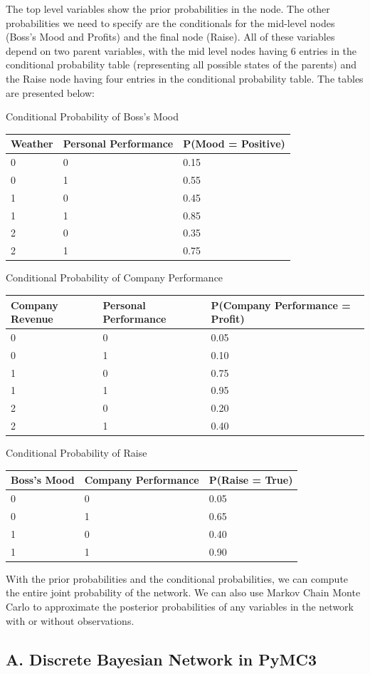 \documentclass[11pt]{article}
\begin{document}
The top level variables show the prior probabilities in the node. The
other probabilities we need to specify are the conditionals for the
mid-level nodes (Boss's Mood and Profits) and the final node (Raise).
All of these variables depend on two parent variables, with the mid
level nodes having 6 entries in the conditional probability table
(representing all possible states of the parents) and the Raise node
having four entries in the conditional probability table. The tables are
presented below:

Conditional Probability of Boss's Mood

\begin{longtable}[]{@{}lll@{}}
\toprule
Weather & Personal Performance & P(Mood = Positive)\tabularnewline
\midrule
\endhead
0 & 0 & 0.15\tabularnewline
0 & 1 & 0.55\tabularnewline
1 & 0 & 0.45\tabularnewline
1 & 1 & 0.85\tabularnewline
2 & 0 & 0.35\tabularnewline
2 & 1 & 0.75\tabularnewline
\bottomrule
\end{longtable}

Conditional Probability of Company Performance

\begin{longtable}[]{@{}lll@{}}
\toprule
Company Revenue & Personal Performance & P(Company Performance =
Profit)\tabularnewline
\midrule
\endhead
0 & 0 & 0.05\tabularnewline
0 & 1 & 0.10\tabularnewline
1 & 0 & 0.75\tabularnewline
1 & 1 & 0.95\tabularnewline
2 & 0 & 0.20\tabularnewline
2 & 1 & 0.40\tabularnewline
\bottomrule
\end{longtable}

Conditional Probability of Raise

\begin{longtable}[]{@{}lll@{}}
\toprule
Boss's Mood & Company Performance & P(Raise = True)\tabularnewline
\midrule
\endhead
0 & 0 & 0.05\tabularnewline
0 & 1 & 0.65\tabularnewline
1 & 0 & 0.40\tabularnewline
1 & 1 & 0.90\tabularnewline
\bottomrule
\end{longtable}

With the prior probabilities and the conditional probabilities, we can
compute the entire joint probability of the network. We can also use
Markov Chain Monte Carlo to approximate the posterior probabilities of
any variables in the network with or without observations.

    \hypertarget{a.-discrete-bayesian-network-in-pymc3}{%
\subsection{A. Discrete Bayesian Network in
PyMC3}\label{a.-discrete-bayesian-network-in-pymc3}}
\end{document}
